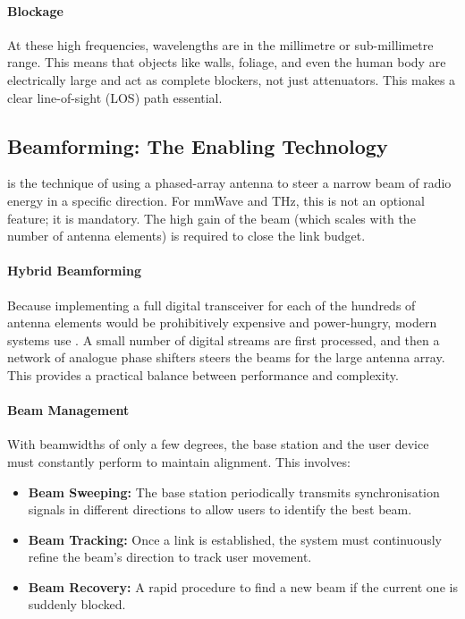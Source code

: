 \paragraph{Blockage}
At these high frequencies, wavelengths are in the millimetre or sub-millimetre range. This means that objects like walls, foliage, and even the human body are electrically large and act as complete blockers, not just attenuators. This makes a clear line-of-sight (LOS) path essential.


\subsection{Beamforming: The Enabling Technology}

 is the technique of using a phased-array antenna to steer a narrow beam of radio energy in a specific direction. For mmWave and THz, this is not an optional feature; it is mandatory. The high gain of the beam (which scales with the number of antenna elements) is required to close the link budget.

\paragraph{Hybrid Beamforming}
Because implementing a full digital transceiver for each of the hundreds of antenna elements would be prohibitively expensive and power-hungry, modern systems use . A small number of digital streams are first processed, and then a network of analogue phase shifters steers the beams for the large antenna array. This provides a practical balance between performance and complexity.

\paragraph{Beam Management}
With beamwidths of only a few degrees, the base station and the user device must constantly perform  to maintain alignment. This involves:
\begin{itemize}
    \item \textbf{Beam Sweeping:} The base station periodically transmits synchronisation signals in different directions to allow users to identify the best beam.
    \item \textbf{Beam Tracking:} Once a link is established, the system must continuously refine the beam's direction to track user movement.
    \item \textbf{Beam Recovery:} A rapid procedure to find a new beam if the current one is suddenly blocked.
\end{itemize}


